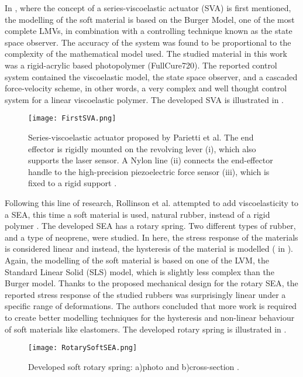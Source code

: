 In \cite{parietti2011series}, where the concept of a series-viscoelastic actuator (SVA) is first mentioned, the modelling of the soft material is based on the Burger Model, one of the most complete LMVs, in combination with a controlling technique known as the state space observer. The accuracy of the system was found to be proportional to the complexity of the mathematical model used. The studied material in this work was a rigid-acrylic based photopolymer (FullCure720). The reported control system contained the viscoelastic model, the state space observer, and a cascaded force-velocity scheme, in other words, a very complex and well thought control system for a linear viscoelastic polymer. The developed SVA is illustrated in . 

\begin{figure}[htb!]
    \centering
    \texttt{[image: FirstSVA.png]}
    \caption{Series-viscoelastic actuator proposed by Parietti et al. The end effector is rigidly mounted on the revolving lever (i), which also supports the laser sensor. A Nylon line (ii) connects the end-effector handle to the high-precision piezoelectric force sensor (iii), which is fixed to a rigid support \cite{parietti2011series}.}
    \label{fig:firstSVA}
\end{figure}

Following this line of research, Rollinson et al. attempted to add viscoelasticity to a SEA, this time a soft material is used, natural rubber, instead of a rigid polymer \cite{rollinson2013design}. The developed SEA has a rotary spring. Two different types of rubber, and a type of neoprene, were studied. In here, the stress response of the materials is considered linear and instead, the hysteresis of the material is modelled ( in ). Again, the modelling of the soft material is based on one of the LVM, the Standard Linear Solid (SLS) model, which is slightly less complex than the Burger model. Thanks to the proposed mechanical design for the rotary SEA, the reported stress response of the studied rubbers was surprisingly linear under a specific range of deformations. The authors concluded that more work is required to create better modelling techniques for the hysteresis and non-linear behaviour of soft materials like elastomers. The developed rotary spring is illustrated in .

\begin{figure}[htb!]
    \centering
    \texttt{[image: RotarySoftSEA.png]}
    \caption{Developed soft rotary spring: a)photo and b)cross-section \cite{rollinson2013design}.}
    \label{fig:rotarySoftSEA}
\end{figure}

